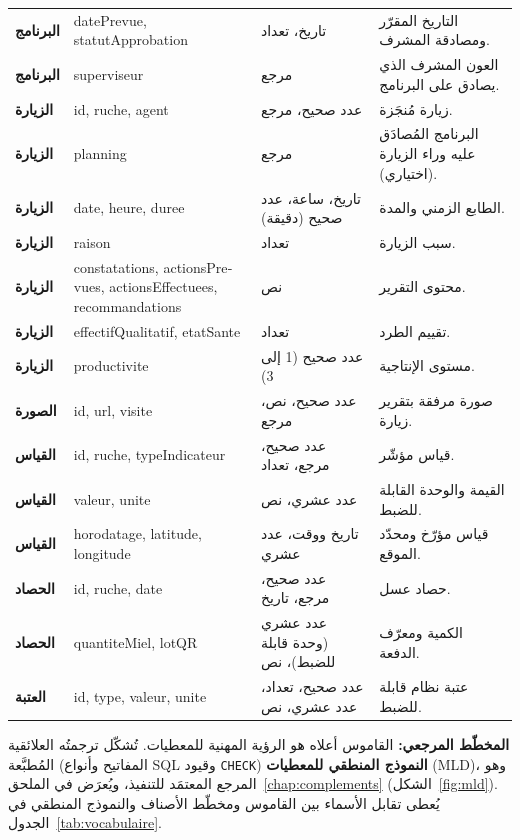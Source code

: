 \begin{xltabular}{\textwidth}{>{\bfseries}p{2.6cm} p{3.4cm} p{2.6cm} X}
البرنامج & \textenglish{datePrevue, statutApprobation} & تاريخ، تعداد & التاريخ المقرّر ومصادقة المشرف. \\
البرنامج & \textenglish{superviseur} & مرجع & العون المشرف الذي يصادق على البرنامج. \\
الزيارة & \textenglish{id, ruche, agent} & عدد صحيح، مرجع & زيارة مُنجَزة. \\
الزيارة & \textenglish{planning} & مرجع & البرنامج المُصادَق عليه وراء الزيارة (اختياري). \\
الزيارة & \textenglish{date, heure, duree} & تاريخ، ساعة، عدد صحيح (دقيقة) & الطابع الزمني والمدة. \\
الزيارة & \textenglish{raison} & تعداد & سبب الزيارة. \\
الزيارة & \textenglish{constatations, actionsPrevues, actionsEffectuees, recommandations} & نص & محتوى التقرير. \\
الزيارة & \textenglish{effectifQualitatif, etatSante} & تعداد & تقييم الطرد. \\
الزيارة & \textenglish{productivite} & عدد صحيح (1 إلى 3) & مستوى الإنتاجية. \\
الصورة & \textenglish{id, url, visite} & عدد صحيح، نص، مرجع & صورة مرفقة بتقرير زيارة. \\
القياس & \textenglish{id, ruche, typeIndicateur} & عدد صحيح، مرجع، تعداد & قياس مؤشّر. \\
القياس & \textenglish{valeur, unite} & عدد عشري، نص & القيمة والوحدة القابلة للضبط. \\
القياس & \textenglish{horodatage, latitude, longitude} & تاريخ ووقت، عدد عشري & قياس مؤرّخ ومحدّد الموقع. \\
الحصاد & \textenglish{id, ruche, date} & عدد صحيح، مرجع، تاريخ & حصاد عسل. \\
الحصاد & \textenglish{quantiteMiel, lotQR} & عدد عشري (وحدة قابلة للضبط)، نص & الكمية ومعرّف الدفعة. \\
العتبة & \textenglish{id, type, valeur, unite} & عدد صحيح، تعداد، عدد عشري، نص & عتبة نظام قابلة للضبط. \\
\bottomrule
\end{xltabular}

\begin{encadre}
\textbf{المخطّط المرجعي:} القاموس أعلاه هو الرؤية المهنية للمعطيات. تُشكّل
ترجمتُه العلائقية المُطبَّعة (المفاتيح وأنواع \textenglish{SQL} وقيود
\texttt{CHECK}) \textbf{النموذج المنطقي للمعطيات} (\textenglish{MLD})، وهو المرجع
المعتمَد للتنفيذ، ويُعرَض في الملحق~\ref{chap:complements}
(الشكل~\ref{fig:mld}). يُعطى تقابل الأسماء بين القاموس ومخطّط الأصناف والنموذج
المنطقي في الجدول~\ref{tab:vocabulaire}.
\end{encadre}

